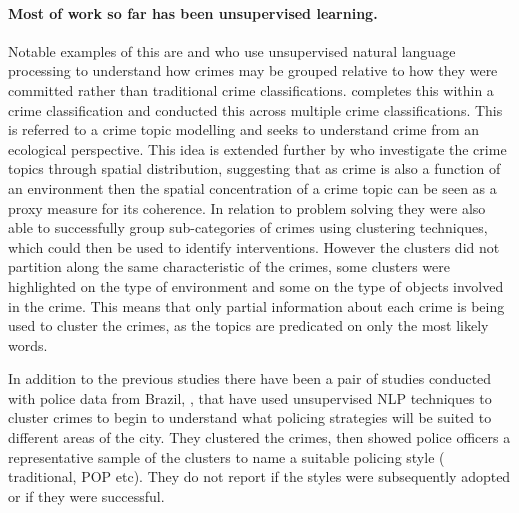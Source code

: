 \paragraph{Most of work so far has been unsupervised learning.} Notable examples of this are \textcite{birks2020unsupervised} and \textcite{kuang2017crime} who use unsupervised natural language processing to understand how crimes may be grouped relative to how they were committed rather than traditional crime classifications. \textcite{birks2020unsupervised} completes this within a crime classification and \textcite{kuang2017crime} conducted this across multiple crime classifications. This is referred to a crime topic modelling and seeks to understand crime from an ecological perspective. This idea is extended further by \textcite{Pandey201876} who investigate the crime topics through spatial distribution, suggesting that as crime is also a function of an environment then the spatial concentration of a crime topic can be seen as a proxy measure for its coherence. In relation to problem solving they were also able to successfully group sub-categories of crimes using clustering techniques, which could then be used to identify interventions. However the clusters did not partition along the same characteristic of the crimes, some clusters were highlighted on the type of environment and some on the type of objects involved in the crime. This means that only partial information about each crime is being used to cluster the crimes, as the topics are predicated on only the most likely words. 

In addition to the previous studies there have been a pair of studies conducted with police data from Brazil, \parencite{Basilio2020849, Basilio2019333}, that have used unsupervised NLP techniques to cluster crimes to begin to understand what policing strategies will be suited to different areas of the city. They clustered the crimes, then showed police officers a representative sample of the clusters to name a suitable policing style ( traditional, POP etc). They do not report if the styles were subsequently adopted or if they were successful.

